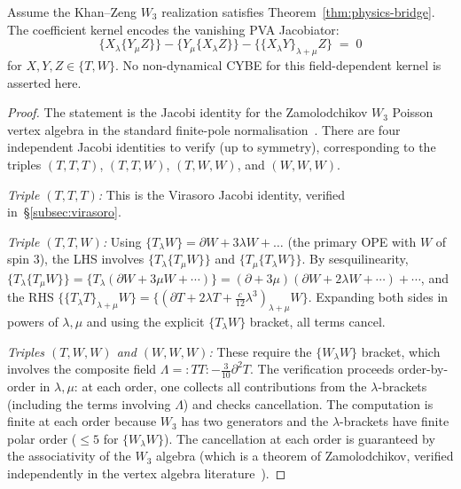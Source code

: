 \begin{theorem}
Assume the Khan--Zeng $W_3$ realization satisfies
Theorem~\ref{thm:physics-bridge}.
The coefficient kernel encodes the vanishing PVA Jacobiator:
\begin{equation}
\{X_\lambda \{Y_\mu Z\}\}
- \{Y_\mu \{X_\lambda Z\}\}
- \{\{X_\lambda Y\}_{\lambda+\mu} Z\}
\;=\;0
\end{equation}
for $X,Y,Z\in\{T,W\}$. No non-dynamical CYBE for this
field-dependent kernel is asserted here.
\end{theorem}

\begin{proof}
The statement is the Jacobi identity for the Zamolodchikov
$W_3$ Poisson vertex algebra in the standard finite-pole
normalisation~\cite{BouFeiMal90}.
There are four independent Jacobi identities to verify (up to symmetry), corresponding to the triples $(T,T,T)$, $(T,T,W)$, $(T,W,W)$, and $(W,W,W)$.

\emph{Triple $(T,T,T)$:} This is the Virasoro Jacobi identity, verified in~\S\ref{subsec:virasoro}.

\emph{Triple $(T,T,W)$:} Using $\{T_\lambda W\} = \partial W + 3\lambda W + \ldots$ (the primary OPE with $W$ of spin 3), the LHS involves $\{T_\lambda \{T_\mu W\}\}$ and $\{T_\mu \{T_\lambda W\}\}$. By sesquilinearity, $\{T_\lambda \{T_\mu W\}\} = \{T_\lambda (\partial W + 3\mu W + \cdots)\} = (\partial + 3\mu)(\partial W + 2\lambda W + \cdots) + \cdots$, and the RHS $\{\{T_\lambda T\}_{\lambda+\mu} W\} = \{(\partial T + 2\lambda T + \frac{c}{12}\lambda^3)_{\lambda+\mu} W\}$. Expanding both sides in powers of $\lambda, \mu$ and using the explicit $\{T_\lambda W\}$ bracket, all terms cancel.

\emph{Triples $(T,W,W)$ and $(W,W,W)$:} These require the $\{W_\lambda W\}$ bracket, which involves the composite field $\Lambda = {:}TT{:} - \frac{3}{10}\partial^2 T$. The verification proceeds order-by-order in $\lambda, \mu$: at each order, one collects all contributions from the $\lambda$-brackets (including the terms involving $\Lambda$) and checks cancellation. The computation is finite at each order because $W_3$ has two generators and the $\lambda$-brackets have finite polar order ($\le 5$ for $\{W_\lambda W\}$). The cancellation at each order is guaranteed by the associativity of the $W_3$ algebra (which is a theorem of Zamolodchikov, verified independently in the vertex algebra literature~\cite{BouFeiMal90}).
\end{proof}

